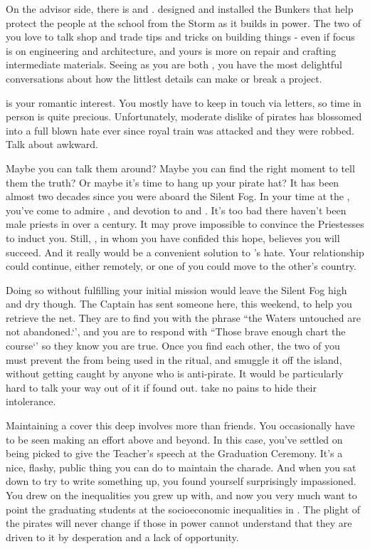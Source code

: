 \documentclass[char]{GL2020}
\begin{document}
On the advisor side, there is \cBunker{} and \cPrince{}. \cBunker{} designed and installed the Bunkers that help protect the people at the school from the Storm as it builds in power. The two of you love to talk shop and trade tips and tricks on building things - even if \cBunker{\their} focus is on engineering and architecture, and yours is more on repair and crafting intermediate materials. Seeing as you are both \pShip{}, you have the most delightful conversations about how the littlest details can make or break a project. 

\cPrince{} is your romantic interest. You mostly have to keep in touch via letters, so time in person is quite precious. Unfortunately, \cPrince{\their} moderate dislike of pirates has blossomed into a full blown hate ever since \cPrince{\their} royal train was attacked and they were robbed. Talk about awkward.

Maybe you can talk them around? Maybe you can find the right moment to tell them the truth? Or maybe it’s time to hang up your pirate hat? It has been almost two decades since you were aboard the Silent Fog. In your time at the \pSc{}, you’ve come to admire \cFlowPriest{}, and \cFlowPriest{\their} devotion to \cEbb{} and \cFlow{}. It’s too bad there haven’t been male priests in over a century. It may prove impossible to convince the Priestesses to induct you. Still, \cBunker{}, in whom you have confided this hope, believes you will succeed. And it really would be a convenient solution to \cPrince{}’s hate. Your relationship could continue, either remotely, or one of you could move to the other’s country.

Doing so without fulfilling your initial mission would leave the Silent Fog high and dry though. The Captain has sent someone here, this weekend, to help you retrieve the net. They are to find you with the phrase ``the Waters untouched are not abandoned.‘’, and you are to respond with ``Those brave enough chart the course‘’ so they know you are true. Once you find each other, the two of you must prevent the \iNet{} from being used in the ritual, and smuggle it off the island, without getting caught by anyone who is anti-pirate. It would be particularly hard to talk your way out of it if \cPrincipal{} found out. \cPrincipal{\They} take no pains to hide their intolerance.

Maintaining a cover this deep involves more than friends. You occasionally have to be seen making an effort above and beyond. In this case, you’ve settled on being picked to give the Teacher’s speech  at the Graduation Ceremony. It’s a nice, flashy, public thing you can do to maintain the charade. And when you sat down to try to write something up, you found yourself surprisingly impassioned. You drew on the inequalities you grew up with, and now you very much want to point the graduating students at the socioeconomic inequalities in \pEarth{}. The plight of the pirates will never change if those in power cannot understand that they are driven to it by desperation and a lack of opportunity.
\end{document}
